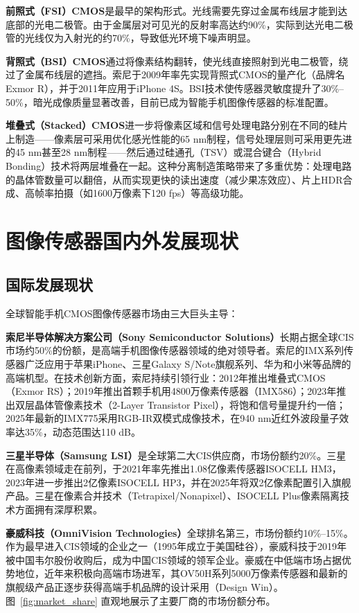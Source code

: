 \documentclass[12pt, a4paper]{ctexart}
\begin{document}
\textbf{前照式（FSI）CMOS}是最早的架构形式。光线需要先穿过金属布线层才能到达底部的光电二极管。由于金属层对可见光的反射率高达约90\%，实际到达光电二极管的光线仅为入射光的约70\%\cite{tencent_cmos}，导致低光环境下噪声明显。

\textbf{背照式（BSI）CMOS}通过将像素结构翻转，使光线直接照射到光电二极管，绕过了金属布线层的遮挡。索尼于2009年率先实现背照式CMOS的量产化（品牌名Exmor R），并于2011年应用于iPhone 4S\cite{csdn_cmos}。BSI技术使传感器灵敏度提升了30\%--50\%，暗光成像质量显著改善，目前已成为智能手机图像传感器的标准配置。

\textbf{堆叠式（Stacked）CMOS}进一步将像素区域和信号处理电路分别在不同的硅片上制造——像素层可采用优化感光性能的65 nm制程，信号处理层则可采用更先进的45 nm甚至28 nm制程——然后通过硅通孔（TSV）或混合键合（Hybrid Bonding）技术将两层堆叠在一起\cite{tencent_cmos}。这种分离制造策略带来了多重优势：处理电路的晶体管数量可以翻倍，从而实现更快的读出速度（减少果冻效应）、片上HDR合成、高帧率拍摄（如1600万像素下120 fps）等高级功能。


\section{图像传感器国内外发展现状}

\subsection{国际发展现状}

全球智能手机CMOS图像传感器市场由三大巨头主导：

\textbf{索尼半导体解决方案公司（Sony Semiconductor Solutions）}长期占据全球CIS市场约50\%的份额，是高端手机图像传感器领域的绝对领导者。索尼的IMX系列传感器广泛应用于苹果iPhone、三星Galaxy S/Note旗舰系列、华为和小米等品牌的高端机型。在技术创新方面，索尼持续引领行业：2012年推出堆叠式CMOS（Exmor RS）；2019年推出首颗手机用4800万像素传感器（IMX586）；2023年推出双层晶体管像素技术（2-Layer Transistor Pixel），将饱和信号量提升约一倍；2025年最新的IMX775采用RGB-IR双模式成像技术，在940 nm近红外波段量子效率达35\%，动态范围达110 dB\cite{statsmarket2026}。

\textbf{三星半导体（Samsung LSI）}是全球第二大CIS供应商，市场份额约20\%。三星在高像素领域走在前列，于2021年率先推出1.08亿像素传感器ISOCELL HM3，2023年进一步推出2亿像素ISOCELL HP3，并在2025年将双2亿像素配置引入旗舰产品\cite{adhocnews2025}。三星在像素合并技术（Tetrapixel/Nonapixel）、ISOCELL Plus像素隔离技术方面拥有深厚积累。

\textbf{豪威科技（OmniVision Technologies）}全球排名第三，市场份额约10\%--15\%。作为最早进入CIS领域的企业之一（1995年成立于美国硅谷），豪威科技于2019年被中国韦尔股份收购后，成为中国CIS领域的领军企业。豪威在中低端市场占据优势地位，近年来积极向高端市场进军，其OV50H系列5000万像素传感器和最新的旗舰级产品正逐步获得高端手机品牌的设计采用（Design Win）\cite{adhocnews2025}。图~\ref{fig:market_share} 直观地展示了主要厂商的市场份额分布。
\end{document}
